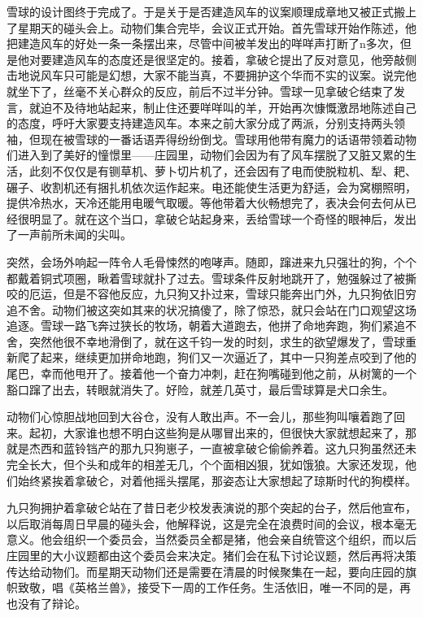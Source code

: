 雪球的设计图终于完成了。于是关于是否建造风车的议案顺理成章地又被正式搬上了星期天的碰头会上。动物们集合完毕，会议正式开始。首先雪球开始作陈述，他把建造风车的好处一条一条摆出来，尽管中间被羊发出的咩咩声打断了n多次，但是他对要建造风车的态度还是很坚定的。接着，拿破仑提出了反对意见，他旁敲侧击地说风车只可能是幻想，大家不能当真，不要拥护这个华而不实的议案。说完他就坐下了，丝毫不关心群众的反应，前后不过半分钟。雪球一见拿破仑结束了发言，就迫不及待地站起来，制止住还要咩咩叫的羊，开始再次慷慨激昂地陈述自己的态度，呼吁大家要支持建造风车。本来之前大家分成了两派，分别支持两头领袖，但现在被雪球的一番话语弄得纷纷倒戈。雪球用他带有魔力的话语带领着动物们进入到了美好的憧憬里——庄园里，动物们会因为有了风车摆脱了又脏又累的生活，此刻不仅仅是有铡草机、萝卜切片机了，还会因有了电而使脱粒机、犁、耙、碾子、收割机还有捆扎机依次运作起来。电还能使生活更为舒适，会为窝棚照明，提供冷热水，天冷还能用电暖气取暖。等他带着大伙畅想完了，表决会何去何从已经很明显了。就在这个当口，拿破仑站起身来，丢给雪球一个奇怪的眼神后，发出了一声前所未闻的尖叫。

突然，会场外响起一阵令人毛骨悚然的咆哮声。随即，蹿进来九只强壮的狗，个个都戴着铜式项圈，瞅着雪球就扑了过去。雪球条件反射地跳开了，勉强躲过了被撕咬的厄运，但是不容他反应，九只狗又扑过来，雪球只能奔出门外，九只狗依旧穷追不舍。动物们被这突如其来的状况搞傻了，除了惊恐，就只会站在门口观望这场追逐。雪球一路飞奔过狭长的牧场，朝着大道跑去，他拼了命地奔跑，狗们紧追不舍，突然他很不幸地滑倒了，就在这千钧一发的时刻，求生的欲望爆发了，雪球重新爬了起来，继续更加拼命地跑，狗们又一次逼近了，其中一只狗差点咬到了他的尾巴，幸而他甩开了。接着他一个奋力冲刺，赶在狗嘴碰到他之前，从树篱的一个豁口蹿了出去，转眼就消失了。好险，就差几英寸，最后雪球算是犬口余生。

动物们心惊胆战地回到大谷仓，没有人敢出声。不一会儿，那些狗叫嚷着跑了回来。起初，大家谁也想不明白这些狗是从哪冒出来的，但很快大家就想起来了，那就是杰西和蓝铃铛产的那九只狗崽子，一直被拿破仑偷偷养着。这九只狗虽然还未完全长大，但个头和成年的相差无几，个个面相凶狠，犹如饿狼。大家还发现，他们始终紧挨着拿破仑，对着他摇头摆尾，那姿态让大家想起了琼斯时代的狗模样。

九只狗拥护着拿破仑站在了昔日老少校发表演说的那个突起的台子，然后他宣布，以后取消每周日早晨的碰头会，他解释说，这是完全在浪费时间的会议，根本毫无意义。他会组织一个委员会，当然委员全都是猪，他会亲自统管这个组织，而以后庄园里的大小议题都由这个委员会来决定。猪们会在私下讨论议题，然后再将决策传达给动物们。而星期天动物们还是需要在清晨的时候聚集在一起，要向庄园的旗帜致敬，唱《英格兰兽》，接受下一周的工作任务。生活依旧，唯一不同的是，再也没有了辩论。


